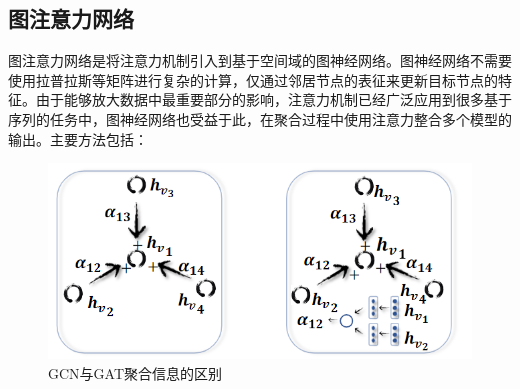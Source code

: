\subsection{图注意力网络}
图注意力网络是将注意力机制引入到基于空间域的图神经网络。图神经网络不需要使用拉普拉斯等矩阵进行复杂的计算，仅通过邻居节点的表征来更新目标节点的特征。由于能够放大数据中最重要部分的影响，注意力机制已经广泛应用到很多基于序列的任务中，图神经网络也受益于此，在聚合过程中使用注意力整合多个模型的输出。主要方法包括：
\begin{figure}[htb]
    \includegraphics[width=1.2\textwidth]{fig/gcn-gat.png}
    \caption{GCN与GAT聚合信息的区别}
    \label{fig:GCN-GAT}
  \end{figure}
